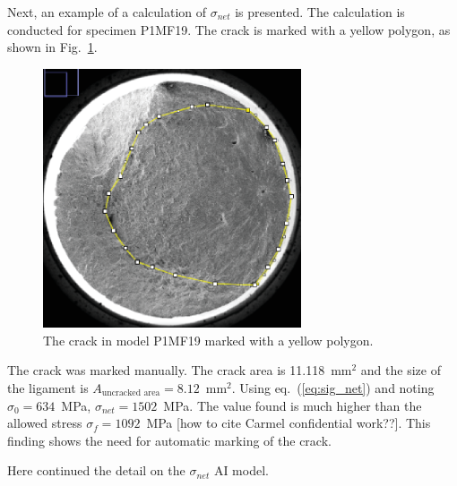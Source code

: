 \documentclass[preprint,12pt]{elsarticle}
\begin{document}
Next, an example of a calculation of $\sigma_{net}$ is presented.
The calculation is conducted for specimen P1MF19.
The crack is marked with a yellow polygon, as shown in Fig.~\ref{fig:P1MF19}.
%
\begin{figure}[t!]
  \begin{center}
  \includegraphics[width=3in]{P1MF19.eps}
  \caption{The crack in model P1MF19 marked with a yellow polygon.}
  \label{fig:P1MF19}
   \end{center}
\end{figure}
%
The crack was marked manually.
The crack area is 11.118~mm$^2$ and the size of the ligament is $A_{\mbox{uncracked area}}=8.12$~mm$^2$.
Using eq.~(\ref{eq:sig_net}) and noting $\sigma_0=634$~MPa,
                           $\sigma_{net}=1502$~MPa.
The value found is much higher than the allowed stress $\sigma_f=1092$~MPa [how to cite Carmel confidential work??].
This finding shows the need for automatic marking of the crack.


%
%
Here continued the detail on the $\sigma_{net}$ AI model.

\end{document}
